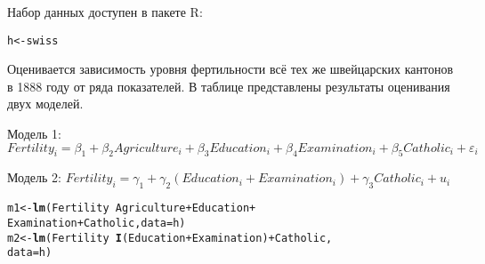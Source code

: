 \documentclass[pdftex,11pt,openany]{book}\usepackage[]{graphicx}\usepackage[]{color}
\makeatletter
\newcommand{\hlopt}[1]{\textcolor[rgb]{0,0,0}{#1}}%
\newcommand{\hlstd}[1]{\textcolor[rgb]{0.345,0.345,0.345}{#1}}%
\newcommand{\hlkwb}[1]{\textcolor[rgb]{0.69,0.353,0.396}{#1}}%
\newcommand{\hlkwc}[1]{\textcolor[rgb]{0.333,0.667,0.333}{#1}}%
\newcommand{\hlkwd}[1]{\textcolor[rgb]{0.737,0.353,0.396}{\textbf{#1}}}%
\newenvironment{kframe}{%
 \def\at@end@of@kframe{}%
 \ifinner\ifhmode%
  \def\at@end@of@kframe{\end{minipage}}%
  \begin{minipage}{\columnwidth}%
 \fi\fi%
 \def\FrameCommand##1{\hskip\@totalleftmargin \hskip-\fboxsep
 \colorbox{shadecolor}{##1}\hskip-\fboxsep
     \hskip-\linewidth \hskip-\@totalleftmargin \hskip\columnwidth}%
 \MakeFramed {\advance\hsize-\width
   \@totalleftmargin\z@ \linewidth\hsize
   \@setminipage}}%
 {\par\unskip\endMakeFramed%
 \at@end@of@kframe}
\newenvironment{knitrout}{}{} %
\makeatother
\begin{document}
\begin{problem}
Набор данных доступен в пакете R:
\begin{knitrout}
\color{fgcolor}\begin{kframe}
\begin{alltt}
\hlstd{h} \hlkwb{<-} \hlstd{swiss}
\end{alltt}
\end{kframe}
\end{knitrout}

\end{problem}

\begin{solution}
\end{solution}



\begin{problem}
 Оценивается зависимость уровня фертильности всё тех же швейцарских кантонов в 1888 году от ряда показателей. В таблице представлены результаты оценивания двух моделей.

Модель 1: $Fertility_i=\beta_1+\beta_2 Agriculture_i+\beta_3 Education_i+\beta_4 Examination_i+\beta_5 Catholic_i+\varepsilon_i$

Модель 2: $Fertility_i=\gamma_1+\gamma_2 (Education_i+Examination_i)+\gamma_3 Catholic_i+u_i$

\begin{knitrout}
\color{fgcolor}\begin{kframe}
\begin{alltt}
\hlstd{m1} \hlkwb{<-} \hlkwd{lm}\hlstd{(Fertility}\hlopt{~}\hlstd{Agriculture}\hlopt{+}\hlstd{Education}\hlopt{+}
  \hlstd{Examination}\hlopt{+}\hlstd{Catholic,}\hlkwc{data}\hlstd{=h)}
\hlstd{m2} \hlkwb{<-} \hlkwd{lm}\hlstd{(Fertility}\hlopt{~}\hlkwd{I}\hlstd{(Education}\hlopt{+}\hlstd{Examination)}\hlopt{+}\hlstd{Catholic,}
  \hlkwc{data}\hlstd{=h)}
\end{alltt}
\end{kframe}
\end{knitrout}



\end{problem}
\end{document}
